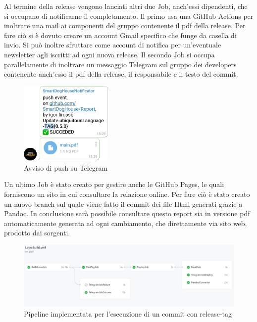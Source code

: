         Al termine della release vengono lanciati altri due Job, anch'essi dipendenti, che si occupano di notificarne il completamento. 
        Il primo usa una GitHub Actions per inoltrare una mail ai componenti del gruppo contenente il pdf della release. Per fare ciò si è dovuto creare un account Gmail specifico che funge da casella di invio. Si può inoltre sfruttare come account di notifica per un'eventuale newsletter agli iscritti ad ogni nuova release. 
        Il secondo Job si occupa parallelamente di inoltrare un messaggio Telegram sul gruppo dei developers contenente anch'esso il pdf della release, il responsabile e il testo del commit. 
        \begin{figure}[H]
            \caption{Avviso di push su Telegram}
            \centering
           \includegraphics[width=0.4\textwidth]{Images/pushTelegram.png}
        \end{figure}
        Un ultimo Job è stato creato per gestire anche le GitHub Pages, le quali forniscono un sito in cui consultare la relazione online. Per fare ciò è stato creato un nuovo branch sul quale viene fatto il commit dei file Html generati grazie a Pandoc.
        In conclusione sarà possibile consultare questo report sia in versione pdf automaticamente generata ad ogni cambiamento, che direttamente via sito web, prodotto dai sorgenti.
        \begin{figure}[H]
            \caption{Pipeline implementata per l'esecuzione di un commit con release-tag}
            \centering
            \includegraphics[width=1\textwidth]{Images/RepoCI.png}
        \end{figure}
        
